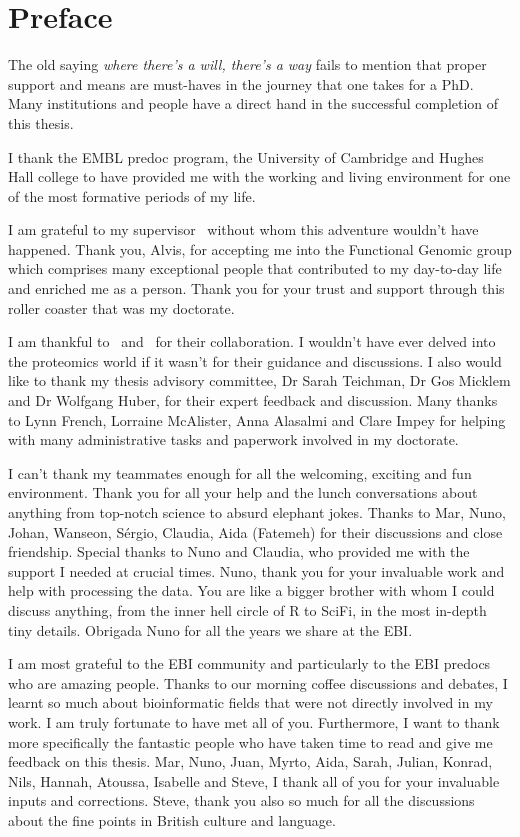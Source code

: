 \chapter*{Preface}
\label{ch:acknowledgements}
\vspace{-1cm}
The old saying \emph{where there's a will, there's a way} fails to mention that
proper support and means are must-haves in the journey that one takes for a PhD.
Many institutions and people have
a direct hand in the successful completion of this thesis.

I thank the EMBL predoc program, the University of Cambridge
and Hughes Hall college to have provided me
with the working and living environment
for one of the most formative periods of my life.

I am grateful to my supervisor \alvis\
without whom this adventure wouldn't have happened.
Thank you, Alvis, for accepting me into the Functional Genomic group
which comprises many exceptional people
that contributed to my day-to-day life and enriched me as a person.
Thank you for your trust and support
through this roller coaster that was my doctorate.

I am thankful to \jyoti\ and \james\ for their collaboration.
I wouldn't have ever delved into the proteomics world
if it wasn't for their guidance and discussions.
I also would like to thank my thesis advisory committee,
Dr Sarah Teichman, Dr Gos Micklem and Dr Wolfgang Huber,
for their expert feedback and discussion.
Many thanks to Lynn French, Lorraine McAlister, Anna Alasalmi
and Clare Impey for helping with many administrative tasks
and paperwork involved in my doctorate.\mybr\

I can't thank my teammates enough for all the welcoming,
exciting and fun environment.
Thank you for all your help and the lunch conversations about anything
from top-notch science to absurd elephant jokes.
Thanks to Mar, Nuno, Johan, Wanseon, Sérgio, Claudia, Aida (Fatemeh)
for their discussions and close friendship.
Special thanks to Nuno and Claudia,
who provided me with the support I needed at crucial times.
Nuno, thank you for your invaluable work and help with processing the data.
You are like a bigger brother with whom I could discuss anything,
from the inner hell circle of R to SciFi, in the most in-depth tiny details.
Obrigada Nuno for all the years we share at the EBI.\@

I am most grateful to the EBI community and
particularly to the EBI predocs who are amazing people.
Thanks to our morning coffee discussions and debates,
I learnt so much about bioinformatic fields that
were not directly involved in my work.
I am truly fortunate to have met all of you.
Furthermore, I want to thank more specifically the fantastic people
who have taken time to read and give me feedback on this thesis.
Mar, Nuno, Juan, Myrto, Aida, Sarah, Julian, Konrad, Nils,
Hannah, Atoussa, Isabelle and Steve,
I thank all of you for your invaluable inputs and corrections.
Steve, thank you also so much for all the discussions
about the fine points in British culture and language.

